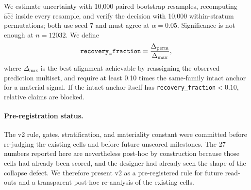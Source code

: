 We estimate uncertainty with 10,000 paired bootstrap resamples, recomputing $\widehat{\mathrm{acc}}$ inside every resample, and verify the decision with 10,000 within-stratum permutations; both use seed 7 and must agree at $\alpha=0.05$. Significance is not enough at $n=12032$. We define
\begin{equation}
\text{\texttt{recovery\_fraction}}=\frac{\Delta_{\mathrm{perm}}}{\Delta_{\max}},
\end{equation}
where $\Delta_{\max}$ is the best alignment achievable by reassigning the observed prediction multiset, and require at least 0.10 times the same-family intact anchor for a material signal. If the intact anchor itself has \texttt{recovery\_fraction}$<0.10$, relative claims are blocked.

\paragraph{Pre-registration status.}
The v2 rule, gates, stratification, and materiality constant were committed before re-judging the existing cells and before future unscored milestones. The 27 numbers reported here are nevertheless post-hoc by construction because those cells had already been scored, and the designer had already seen the shape of the collapse defect. We therefore present v2 as a pre-registered rule for future read-outs and a transparent post-hoc re-analysis of the existing cells.
